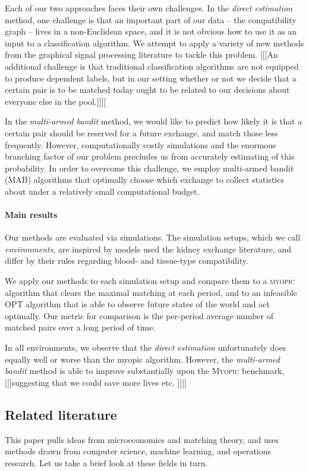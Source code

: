 \documentclass[format=acmsmall, review=false]{acmart}
\begin{document}
Each of our two approaches faces their own challenges. In the \emph{direct estimation} method, one challenge is that an important part of our data -- the compatibility graph -- lives in a non-Euclidean space, and it is not obvious how to use it as an input to a classification algorithm. We attempt to apply a variety of new methods from the graphical signal processing literature to tackle this problem. [[[An additional challenge is that traditional classification algorithms are not equipped to produce dependent labels, but in our setting whether or not we decide that a certain pair is to be matched today ought to be related to our decisions about everyone else in the pool.]]]] 

In the \emph{multi-armed bandit} method, we would like to predict how likely it is that a certain pair should be reserved for a future exchange, and match those less frequently. However, computationally costly simulations and the enormous branching factor of our problem precludes us from accurately estimating of this probability. In order to overcome this challenge, we employ multi-armed bandit (MAB) algorithms that optimally choose which exchange to collect statistics about under a relatively small computational budget.


\paragraph{\textbf{Main results}} Our methods are evaluated via simulations. The simulation setups, which we call \emph{environments}, are inspired by models used the kidney exchange literature, and differ by their rules regarding blood- and tissue-type compatibility.

We apply our methods to each simulation setup and compare them to a \textsc{myopic} algorithm that clears the maximal matching at each period, and to an infeasible \textsc{OPT} algorithm that is able to observe future states of the world and act optimally. Our metric for comparison is the per-period average number of matched pairs over a long period of time.

In all environments, we observe that the \emph{direct estimation} unfortunately does equally well or worse than the myopic algorithm. However, the \emph{multi-armed bandit} method is able to improve substantially upon the \textsc{Myopic} benchmark, [[[suggesting that we could save more lives etc. ]]]]

\subsection{Related literature} This paper pulls ideas from microeconomics and matching theory, and uses methods drawn from computer science, machine learning, and operations research. Let us take a brief look at these fields in turn. 
\end{document}
